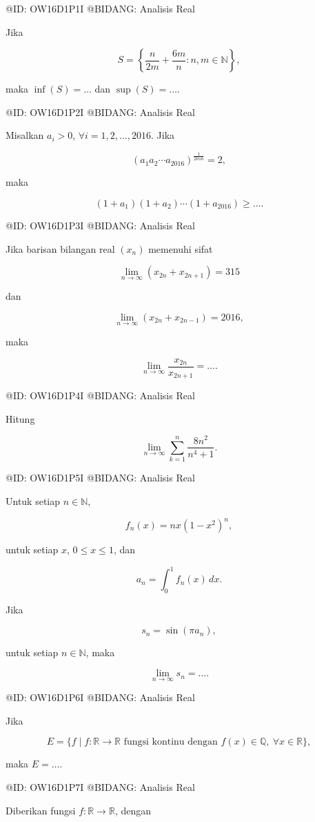 @ID: OW16D1P1I
@BIDANG: Analisis Real

Jika

$$
S=\left\{\frac{n}{2m}+\frac{6m}{n}:n,m\in\mathbb N\right\},
$$

maka $\inf(S)=\ldots$ dan $\sup(S)=\ldots$.

@ID: OW16D1P2I
@BIDANG: Analisis Real

Misalkan $a_i>0$, $\forall i=1,2,\ldots,2016$. Jika

$$
(a_1a_2\cdots a_{2016})^{\frac1{2016}}=2,
$$

maka

$$
(1+a_1)(1+a_2)\cdots(1+a_{2016})\ge \ldots.
$$

@ID: OW16D1P3I
@BIDANG: Analisis Real

Jika barisan bilangan real $(x_n)$ memenuhi sifat

$$
\lim_{n\to\infty}(x_{2n}+x_{2n+1})=315
$$

dan

$$
\lim_{n\to\infty}(x_{2n}+x_{2n-1})=2016,
$$

maka

$$
\lim_{n\to\infty}\frac{x_{2n}}{x_{2n+1}}=\ldots.
$$

@ID: OW16D1P4I
@BIDANG: Analisis Real

Hitung

$$
\lim_{n\to\infty}\sum_{k=1}^{n}\frac{8n^2}{n^4+1}.
$$

@ID: OW16D1P5I
@BIDANG: Analisis Real

Untuk setiap $n\in\mathbb N$,

$$
f_n(x)=nx(1-x^2)^n,
$$

untuk setiap $x$, $0\le x\le 1$, dan

$$
a_n=\int_0^1 f_n(x)\,dx.
$$

Jika

$$
s_n=\sin(\pi a_n),
$$

untuk setiap $n\in\mathbb N$, maka

$$
\lim_{n\to\infty}s_n=\ldots.
$$

@ID: OW16D1P6I
@BIDANG: Analisis Real

Jika

$$
E=\{f\mid f:\mathbb R\to\mathbb R \text{ fungsi kontinu dengan } f(x)\in\mathbb Q,\ \forall x\in\mathbb R\},
$$

maka $E=\ldots$.

@ID: OW16D1P7I
@BIDANG: Analisis Real

Diberikan fungsi $f:\mathbb R\to\mathbb R$, dengan

